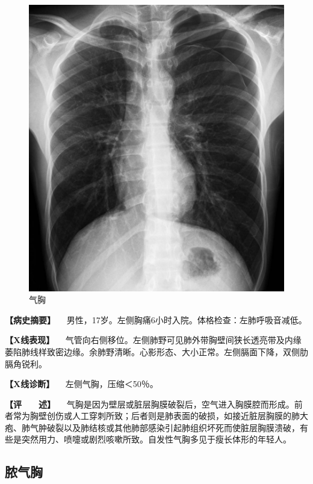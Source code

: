 \begin{figure}[!htbp]
 \centering
 \includegraphics{./images/Image00189.jpg}
 \captionsetup{justification=centering}
 \caption{气胸}
 \label{fig3-11-3}
  \end{figure} 

\textbf{【病史摘要】}
　男性，17岁。左侧胸痛6小时入院。体格检查：左肺呼吸音减低。

\textbf{【X线表现】}
　气管向右侧移位。左侧肺野可见肺外带胸壁间狭长透亮带及内缘萎陷肺线样致密边缘。余肺野清晰。心影形态、大小正常。左侧膈面下降，双侧肋膈角锐利。

\textbf{【X线诊断】} 　左侧气胸，压缩＜50％。

\textbf{【评　　述】}
　气胸是因为壁层或脏层胸膜破裂后，空气进入胸膜腔而形成。前者常为胸壁创伤或人工穿刺所致；后者则是肺表面的破损，如接近脏层胸膜的肺大疱、肺气肿破裂以及肺结核或其他肺部感染引起肺组织坏死而使脏层胸膜溃破，有些是突然用力、喷嚏或剧烈咳嗽所致。自发性气胸多见于瘦长体形的年轻人。

\subsection{脓气胸}

